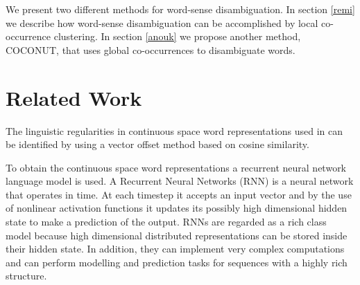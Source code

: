 \documentclass[11pt]{article}
\begin{document}
We present two different methods for word-sense disambiguation. In section \ref{remi} we describe how word-sense disambiguation can be accomplished by local co-occurrence clustering. In section \ref{anouk} we propose another method, COCONUT, that uses global co-occurrences to disambiguate words.

\section{Related Work}
The linguistic regularities in continuous space word representations used in \cite{Mikolov:13} can be identified by using a vector offset method based on cosine similarity. 

To obtain the continuous space word representations a recurrent neural network language model is used. A Recurrent Neural Networks (RNN) is a neural network that operates in time. At each timestep it accepts an input vector and by the use of nonlinear activation functions it updates its possibly high dimensional hidden state to make a prediction of the output. RNNs are regarded as a rich class model because high dimensional distributed representations can be stored inside their hidden state. In addition, they can implement very complex computations and can perform modelling and prediction tasks for sequences with a highly rich structure.
\end{document}
